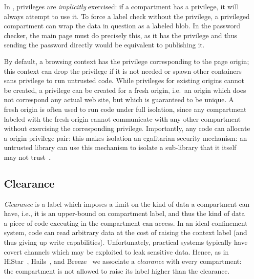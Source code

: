 In \sys{}, privileges are \emph{implicitly} exercised: if a compartment
has a privilege, it will always attempt to use it.  To force a label
check without the privilege, a privileged compartment can wrap the
data in question as a labeled blob.  In the password checker, the main
page must do precisely this, as it has the  privilege and
thus sending the password directly would be equivalent to publishing it.

By default, a browsing context has the privilege corresponding to the
page origin; this context can drop the privilege if it is not
needed or spawn other containers sans privilege to run untrusted code.
%
While privileges for existing origins cannot be created, a privilege can
be created for a fresh origin, i.e.\ an origin which does not correspond
any actual web site, but which is guaranteed to be unique.
%
A fresh origin is often used to run code under full isolation, since any
compartment labeled with the fresh origin cannot communicate with any
other compartment without exercising the corresponding privilege.
%
Importantly, any code can allocate a origin-privilege pair: this
makes isolation an egalitarian security mechanism: an untrusted library
can use this mechanism to isolate a sub-library that it itself
may not trust~\cite{Zeldovich:2006}.

\subsection{Clearance}
\label{sec:clearance}

\emph{Clearance} is a label which imposes a limit on the kind of data a compartment can have,
i.e., it is an upper-bound on compartment label, and thus the kind of
data a piece of code executing in the compartment can access.
%
In an ideal confinement system, code can read arbitrary data at the
cost of raising the context label (and thus giving up write
capabilities).
%
Unfortunately, practical systems typically have covert channels which
may be exploited to leak sensitive data.
%
Hence, as in HiStar~\cite{Zeldovich:2006}, Hails~\cite{giffin:2012:hails}, and
Breeze~\cite{Breeze13} we associate a \emph{clearance} with every
compartment: the compartment is not allowed to raise its label higher
than the clearance.


